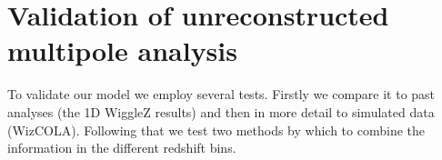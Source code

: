 \documentclass[iop,twocolappendix]{emulateapj}
\begin{document}
\section{Validation of unreconstructed multipole analysis}
\label{sec:test}

To validate our model we employ several tests.  Firstly we compare it to past analyses (the 1D WiggleZ results) and then in more detail to simulated data (WizCOLA).  Following that we test two methods by which to combine the information in the different redshift bins.

\end{document}
